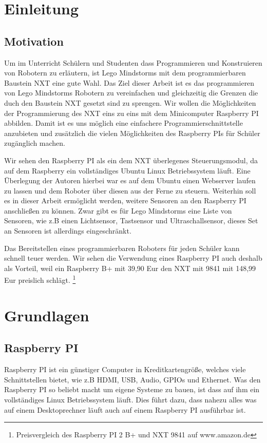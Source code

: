 \chapter{Einleitung}

\section{Motivation}
Um im Unterricht Schülern und Studenten dass Programmieren und Konstruieren von Robotern zu erläutern, ist Lego Mindstorms mit dem programmierbaren Baustein NXT eine gute Wahl. Das Ziel dieser Arbeit ist es das programmieren von Lego Mindstorms Robotern zu vereinfachen und gleichzeitig die Grenzen die duch den Baustein NXT gesetzt sind zu sprengen. Wir wollen die Möglichkeiten der Programmierung des NXT eins zu eins mit dem Minicomputer Raspberry PI abbilden. Damit ist es uns möglich eine einfachere Programmierschnittstelle anzubieten und zusätzlich die vielen Möglichkeiten des Raspberry PIs für Schüler zugänglich machen. 

Wir sehen den Raspberry PI als ein dem NXT überlegenes Steuerungsmodul, da auf dem Raspberry ein vollständiges Ubuntu Linux Betriebssystem läuft. Eine Überlegung der Autoren hierbei war es auf dem Ubuntu einen Webserver laufen zu lassen und dem Roboter über diesen aus der Ferne zu steuern.
Weiterhin soll es in dieser Arbeit ermöglicht werden, weitere Sensoren an den Raspberry PI anschließen zu können. Zwar gibt es für Lego Mindstorms eine Liste von Sensoren, wie z.B einen Lichtsensor, Tastsensor und Ultraschallsensor, dieses Set an Sensoren ist allerdings eingeschränkt.

Das Bereitstellen eines programmierbaren Roboters für jeden Schüler kann schnell teuer werden. Wir sehen die Verwendung eines Raspberry PI auch deshalb als Vorteil, weil ein Raspberry B+ mit 39,90 Eur den NXT mit 9841 mit 148,99 Eur preislich schlägt. \footnote{Preisvergleich des Raspberry PI 2 B+ und NXT 9841 auf www.amazon.de}

\chapter{Grundlagen}
\section{Raspberry PI}
\label{Grundlagen:RaspberryPI}

Raspberry PI ist ein günstiger Computer in Kreditkartengröße, welches viele Schnittstellen bietet, wie z.B HDMI, USB, Audio, GPIOs und Ethernet.
Was den Raspberry PI so beliebt macht um eigene Systeme zu bauen, ist dass auf ihm ein vollständiges Linux Betriebssystem läuft. Dies führt dazu, dass nahezu alles was auf einem Desktoprechner läuft auch auf einem Raspberry PI ausführbar ist.

